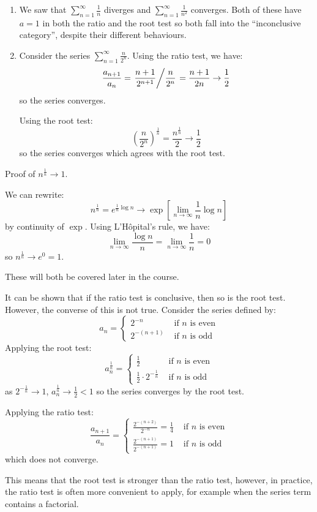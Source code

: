 \documentclass[../main.tex]{subfiles}
\begin{document}
\begin{example}
  \begin{enumerate}
    \item We saw that $\sum_{n = 1}^{\infty} \frac{1}{n}$ diverges and $\sum_{n = 1}^{\infty} \frac{1}{n^2}$ converges.
      Both of these have $a = 1$ in both the ratio and the root test so both fall into the ``inconclusive category'', despite their different behaviours.
    \item Consider the series $\sum_{n = 1}^{\infty} \frac{n}{2^{n}}$.
      Using the ratio test, we have:
      \[
        \frac{a_{n + 1}}{a_n} = \left. \frac{n + 1}{2^{n  + 1}}  \middle/ \frac{n}{2^{n}} \right. = \frac{n + 1}{2n} \to \frac{1}{2}
      \]
      so the series converges.

      Using the root test:
      \[
        \left(\frac{n}{2^{n}}\right)^{\frac{1}{n}} = \frac{n^{\frac{1}{n}}}{2} \to \frac{1}{2}
      \]
      so the series converges which agrees with the root test.
  \end{enumerate}
\end{example}
\begin{remark}[Note] Proof of $n^{\frac{1}{n}} \to 1$.\par
  We can rewrite:
  \[
    n^{\frac{1}{n}} = e^{\frac{1}{n}\log n} \to \exp\left[\lim\limits_{n \to \infty}  \frac{1}{n}\log n\right]
  \]
  by continuity of $\exp$.
  Using L'H\^opital's rule, we have:
  \[
    \lim_{n \to \infty} \frac{\log n}{n} = \lim_{n \to \infty} \frac{1}{n} = 0
  \]
  so $n^{\frac{1}{n}} \to e^{0} = 1$.

  These will both be covered later in the course.
\end{remark}
\begin{remark}
  It can be shown that if the ratio test is conclusive, then so is the root test.
  However, the converse of this is not true.
  Consider the series defined by:
  \[
    a_n = \begin{cases}
    2^{-n} & \text{ if $n$ is even} \\
    2^{-(n + 1)} & \text{ if $n$ is odd}
    \end{cases}
  \]
  Applying the root test:
  \[
    a^{\frac{1}{n}}_{n} = \begin{cases}
    \frac{1}{2} & \text{ if $n$ is even} \\
    \frac{1}{2} \cdot 2^{-\frac{1}{n}} & \text{ if $n$ is odd}
    \end{cases}
  \]
  as $2^{-\frac{1}{n}} \to 1$, $a^{\frac{1}{n}}_{n} \to \frac{1}{2} < 1$ so the series converges by the root test.

  Applying the ratio test:
  \[
    \frac{a_{n + 1}}{a_{n}} = \begin{cases}
    \frac{2^{-(n + 2)}}{2^{-n}} = \frac{1}{4} & \text{ if $n$ is even} \\
    \frac{2^{-(n + 1)}}{2^{-(n + 1)}} = 1 & \text{ if $n$ is odd}
    \end{cases}
  \]
  which does not converge.

  This means that the root test is stronger than the ratio test, however, in practice, the ratio test is often more convenient to apply, for example when the series term contains a factorial.
\end{remark}
\end{document}
